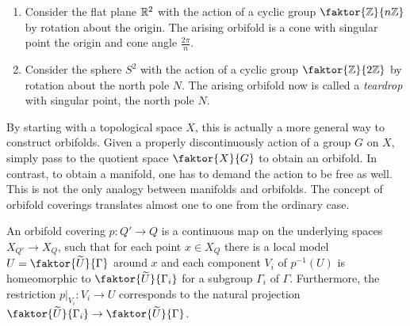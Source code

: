\begin{example} %
    \begin{enumerate}
        \item Consider the flat plane \(\mathbb{R}^2\) with the action of a cyclic group \(\faktor{\Z}{n\Z}\) by rotation about the origin.
            The arising orbifold is a cone with singular point the origin and cone angle \(\frac{2\pi}{n}\).
        
        \item Consider the sphere \(S^2\) with the action of a cyclic group \(\faktor{\Z}{2\Z}\) by rotation about the north pole \(N\).
            The arising orbifold now is called a \emph{teardrop} with singular point, the north pole \(N\).
            
    \end{enumerate}
\end{example}

By starting with a topological space \(X\), this is actually a more general way to construct orbifolds.
Given a properly discontinuously action of a group \(G\) on \(X\), simply pass to the quotient space \(\faktor{X}{G}\) to obtain an orbifold.
In contrast, to obtain a manifold, one has to demand the action to be free as well.
This is not the only analogy between manifolds and orbifolds.
The concept of orbifold coverings translates almost one to one from the ordinary case.

\begin{definition}
    An orbifold covering \(p: Q' \to Q\) is a continuous map on the underlying spaces \(X_{Q'} \to X_Q\), such that for each point \(x \in X_Q\) there is a local model \(U = \faktor{\widetilde{U}}{\Gamma}\) around \(x\) and each component \(V_i\) of \(p^{-1}(U)\) is homeomorphic to \(\faktor{\widetilde{U}}{\Gamma_i}\) for a subgroup \(\Gamma_i\) of \(\Gamma\).
    Furthermore, the restriction \(p\vert_{V_i} : V_i \to U\) corresponds to the natural projection \(\faktor{\widetilde{U}}{\Gamma_i} \to \faktor{\widetilde{U}}{\Gamma}\).
\end{definition}

